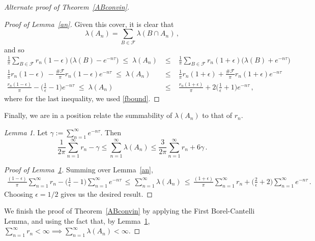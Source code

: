 \documentclass[11pt,reqno]{amsart}
\newcommand{\0}{\mathbf{0}}
\newtheorem{lemma}{Lemma}
\theoremstyle{remark}
\numberwithin{equation}{section}
\newtheorem{lemma}[theorem]{Lemma}
\theoremstyle{remark}
\numberwithin{equation}{section}
\begin{document}
\begin{proof}[Alternate proof of Theorem~\ref{ABconvin}]
\begin{proof}[Proof of Lemma~\ref{an}]
Given this cover, it is clear that  $$\lambda(A_n) = \sum_{B \in \mathscr{F}}\lambda(B \cap A_n) \, ,$$  and so
\begin{eqnarray*}
   \frac{1}{\pi}\sum_{B \in \mathscr{F}} r_n(1-\epsilon)\big(\lambda(B)-e^{-n\tau} \big) \; \leq \; \lambda(A_n) \; &\leq &\; \frac{1}{\pi}\sum_{B \in \mathscr{F}}r_n(1+\epsilon)\big(\lambda(B)+e^{-n\tau} \big)  \\ \frac{1}{\pi}r_n(1-\epsilon)\ - \frac{\#\mathscr{F}}{\pi}r_n(1-\epsilon)e^{-n \tau} \;  \leq \; \lambda(A_n) \; &\leq& \;
    \frac{1}{\pi}r_n(1+\epsilon)+ \frac{\#\mathscr{F}}{\pi}r_n(1+\epsilon) e^{-n\tau}
    \\  \frac{r_n(1-\epsilon)}{\pi} - \big(\frac{1}{\epsilon }-1\big) e^{-n\tau} \; \leq \; \lambda(A_n) \; &\leq& \; \frac{r_n(1+\epsilon)}{\pi}+ 2\big(\frac{1}{\epsilon}+1\big) e^{-n\tau}\, ,
\end{eqnarray*}
    where for the last inequality, we used \eqref{fbound}. 
\end{proof}


Finally, we are in a position relate the summability of $\lambda(A_n)$ to that of  $r_n$.
\begin{lemma}\label{suman}
Let $\gamma:=\sum_{n=1}^\infty e^{-n \tau}$. Then 
    $$
    \frac{1}{2\pi}\sum_{n=1}^\infty r_n- \gamma \leq  \sum_{n=1}^\infty \lambda(A_n) \leq \frac{3}{2\pi} \sum_{n=1}^\infty r_n +  6\gamma\, .
    $$
\end{lemma}
\begin{proof}[Proof of Lemma~\ref{suman}]
    Summing over Lemma~\ref{an},
    \begin{eqnarray*}
     \frac{(1-\epsilon)}{\pi}\sum_{n=1}^\infty r_n -\big(\frac{1}{\epsilon}-1\big)\sum_{n=1}^\infty e^{-n\tau}  \, \leq \,  \sum_{n=1}^\infty \lambda(A_n) \, \leq \, \frac{(1+\epsilon)}{\pi}\sum_{n=1}^\infty r_n +\big( \frac{2}{\epsilon}+2\big)\sum_{n=1}^\infty e^{-n\tau} \, .
    \end{eqnarray*}
    Choosing $\epsilon =1/2$ gives us 
    the desired result.
    \end{proof}
We finish the proof of Theorem~\ref{ABconvin} by applying the First Borel-Cantelli Lemma, and using the fact that, by Lemma~\ref{suman}, $\sum_{n=1}^\infty r_n < \infty \implies \sum_{n=1}^\infty \lambda(A_n) < \infty $.
\end{proof}
\end{document}
